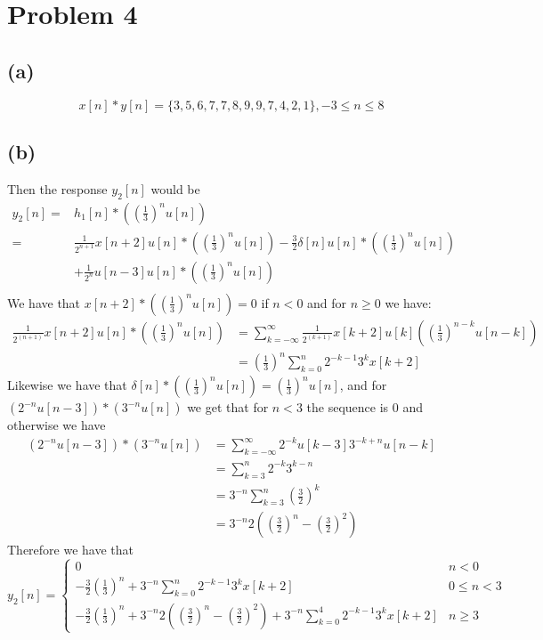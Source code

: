 \section*{Problem 4}
\subsection*{(a)}
$$x[n]*y[n]=\boxed{\{3,5,6,7,7,8,9,9,7,4,2,1\},-3\leq n \leq 8}$$
\subsection*{(b)}
Then the response $y_2[n]$ would be 
\begin{align*}
y_2[n]=&h_1[n]*\left(\left(\frac{1}{3}\right)^nu[n]\right)\\
=&\frac{1}{2^{n+1}}x[n+2]u[n]*\left(\left(\frac{1}{3}\right)^nu[n]\right)-\frac{3}{2}
\delta[n]u[n]*\left(\left(\frac{1}{3}\right)^nu[n]\right)\\
&+\frac{1}{2^n}u[n-3]u[n]*\left(\left(\frac{1}{3}\right)^nu[n]\right)\\
\end{align*}
We have that $x[n+2]*\left(\left(\frac{1}{3}\right)^nu[n]\right)=0$ 
if $n<0$ and for $n\geq 0$ we have:
\begin{align*}
    \frac{1}{2^(n+1)}x[n+2]u[n]*\left(\left(\frac{1}{3}\right)^nu[n]\right)&=\sum_{k=-\infty}^{\infty}\frac{1}{2^{(k+1)}}x[k+2]u[k]\left(\left(\frac{1}{3}\right)^{n-k}u[n-k]\right)\\
    &=\left(\frac{1}{3}\right)^n\sum_{k=0}^{n}2^{-k-1} 3^{k}x[k+2]
\end{align*}
Likewise we have that $\delta[n]*\left(\left(\frac{1}{3}\right)^nu[n]\right)=\left(\frac{1}{3}\right)^nu[n]$, and 
for $ \left(2^{-n}u[n-3]\right)*\left(3^{-n}u[n]\right)$ we get that for $n<3$ the sequence is $0$ and otherwise we have
\begin{align*}
    \left(2^{-n}u[n-3]\right)*\left(3^{-n}u[n]\right)&=\sum_{k=-\infty}^{\infty}2^{-k}u[k-3]3^{-k+n}u[n-k]\\
    &=\sum_{k=3}^{n}2^{-k}3^{k-n}\\
    &=3^{-n}\sum_{k=3}^{n}\left(\frac{3}{2}\right)^{k}\\
    &=3^{-n}2\left(\left(\frac{3}{2}\right)^n-\left(\frac{3}{2}\right)^2\right)
\end{align*}
Therefore we have that 
$$y_2[n]=\boxed{\begin{cases}
    0 & n<0\\
    -\frac{3}{2}\left(\frac{1}{3}\right)^n+3^{-n}\sum_{k=0}^{n}2^{-k-1} 3^{k}x[k+2] & 0\leq n<3\\
    -\frac{3}{2}\left(\frac{1}{3}\right)^n+3^{-n}2\left(\left(\frac{3}{2}\right)^n-\left(\frac{3}{2}\right)^2\right)+3^{-n}\sum_{k=0}^{4}2^{-k-1} 3^{k}x[k+2] & n\geq 3
\end{cases}}$$

